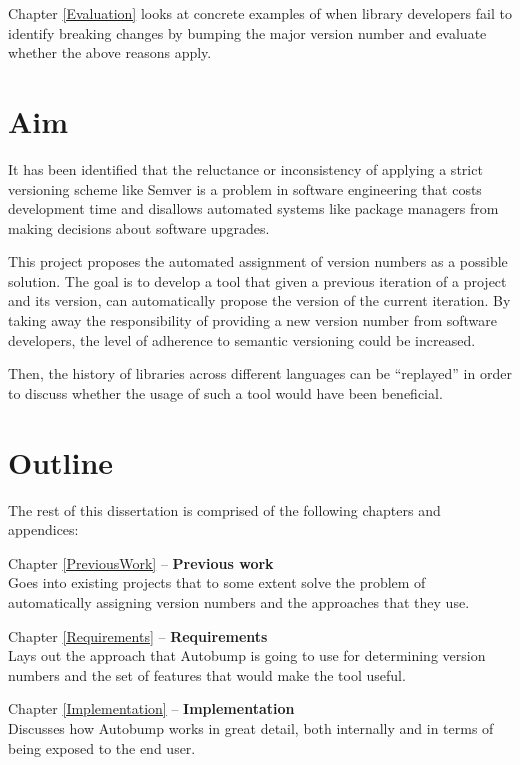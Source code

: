 \documentclass{l4proj}
\begin{document}
Chapter \ref{Evaluation} looks at concrete examples of when
library developers fail to identify breaking changes by bumping the
major version number and evaluate whether the above reasons apply.

\section{Aim}

It has been identified that the reluctance or inconsistency of
applying a strict versioning scheme like Semver is a problem in
software engineering that costs development time and disallows
automated systems like package managers from making decisions about
software upgrades.

This project proposes the automated assignment of version numbers
as a possible solution. The goal is to develop a tool that given a
previous iteration of a project and its version, can automatically
propose the version of the current iteration. By taking away the
responsibility of providing a new version number from software
developers, the level of adherence to semantic versioning could be
increased.

Then, the history of libraries across different languages can be
``replayed'' in order to discuss whether the usage of such a tool
would have been beneficial.

\clearpage
\section{Outline}

The rest of this dissertation is comprised of the following chapters
and appendices:

\noindent Chapter \ref{PreviousWork} -- \textbf{Previous work} \\
Goes into existing projects that to some extent solve the problem
of automatically assigning version numbers and the approaches that
they use.

\noindent Chapter \ref{Requirements} -- \textbf{Requirements} \\
Lays out the approach that Autobump is going to use for
determining version numbers and the set of features that would make
the tool useful.

\noindent Chapter \ref{Implementation} -- \textbf{Implementation} \\
Discusses how Autobump works in great detail, both internally and
in terms of being exposed to the end user.
\end{document}
